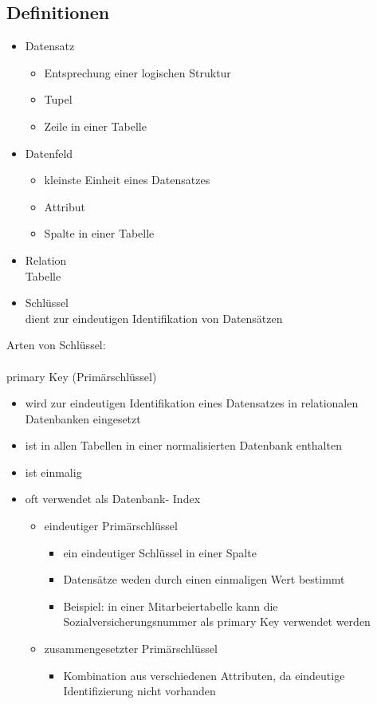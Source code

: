 \documentclass[12pt,a4paper]{report}
\begin{document}
\begin{onehalfspace}
\section{Definitionen}
\begin{itemize}
\item Datensatz
\begin{itemize}
\item Entsprechung einer logischen Struktur
\item Tupel
\item Zeile in einer Tabelle
\end{itemize}
\item Datenfeld
\begin{itemize}
\item kleinste Einheit eines Datensatzes
\item Attribut
\item Spalte in einer Tabelle
\end{itemize}
\item Relation\\
Tabelle
\item Schlüssel\\
dient zur eindeutigen Identifikation von Datensätzen
\end{itemize}
Arten von Schlüssel:\\
\\primary Key (Primärschlüssel)
\begin{itemize}
\item wird zur eindeutigen Identifikation eines Datensatzes in relationalen Datenbanken eingesetzt
\item ist in allen Tabellen in einer normalisierten Datenbank enthalten
\item ist einmalig
\item oft verwendet als Datenbank- Index
\begin{itemize}
\item eindeutiger Primärschlüssel
\begin{itemize}
\item ein eindeutiger Schlüssel in einer Spalte
\item Datensätze weden durch einen einmaligen Wert bestimmt
\item Beispiel: in einer  Mitarbeiertabelle kann die Sozialversicherungsnummer als primary Key verwendet werden
\end{itemize}
\item zusammengesetzter Primärschlüssel
\begin{itemize}
\item Kombination aus verschiedenen Attributen, da eindeutige Identifizierung nicht vorhanden

\end{itemize}
\end{itemize}
\end{itemize}
\end{onehalfspace}
\end{document}
